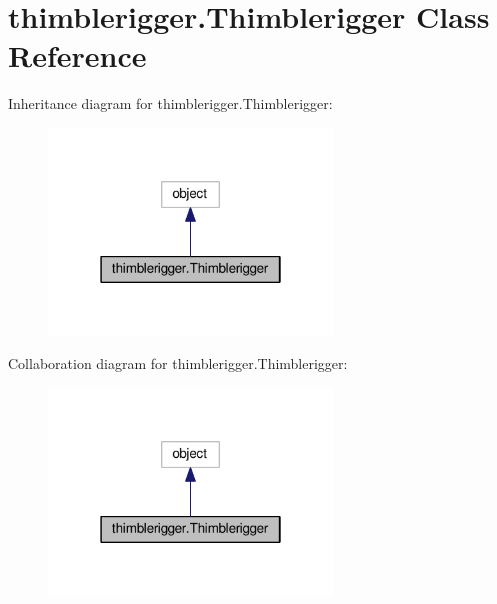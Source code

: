\hypertarget{classthimblerigger_1_1Thimblerigger}{}\section{thimblerigger.\+Thimblerigger Class Reference}
\label{classthimblerigger_1_1Thimblerigger}


Inheritance diagram for thimblerigger.\+Thimblerigger\+:
\nopagebreak
\begin{figure}[H]
\begin{center}
\leavevmode
\includegraphics[width=214pt]{classthimblerigger_1_1Thimblerigger__inherit__graph}
\end{center}
\end{figure}


Collaboration diagram for thimblerigger.\+Thimblerigger\+:
\nopagebreak
\begin{figure}[H]
\begin{center}
\leavevmode
\includegraphics[width=214pt]{classthimblerigger_1_1Thimblerigger__coll__graph}
\end{center}
\end{figure}
